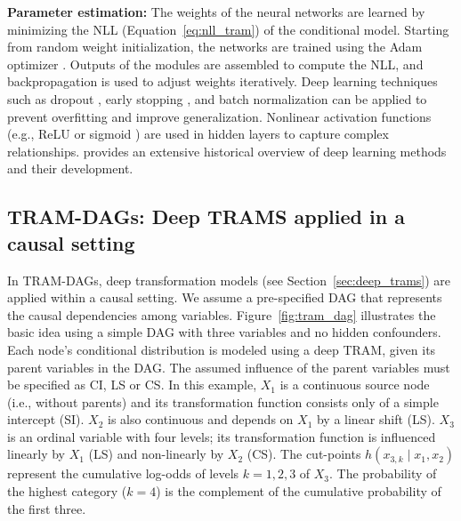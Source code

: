 %
\medskip

\textbf{Parameter estimation:} The weights of the neural networks are learned by minimizing the NLL (Equation~\ref{eq:nll_tram}) of the conditional model. Starting from random weight initialization, the networks are trained using the Adam optimizer \citep{kingma2015}. Outputs of the modules are assembled to compute the NLL, and backpropagation \citep{rumelhart1986} is used to adjust weights iteratively. Deep learning techniques such as dropout \citep{srivastava2014}, early stopping \citep{prechelt2012}, and batch normalization \citep{Ioffe2015} can be applied to prevent overfitting and improve generalization. Nonlinear activation functions (e.g., ReLU \citealp{glorot2011} or sigmoid \citealp{rumelhart1986}) are used in hidden layers to capture complex relationships. \citet{schmidhuber2015} provides an extensive historical overview of deep learning methods and their development.




\subsection{TRAM-DAGs: Deep TRAMS applied in a causal setting} \label{sec:tram_dags}



In TRAM-DAGs, deep transformation models (see Section~\ref{sec:deep_trams}) are applied within a causal setting. We assume a pre-specified DAG that represents the causal dependencies among variables. 
Figure~\ref{fig:tram_dag} illustrates the basic idea using a simple DAG with three variables and no hidden confounders. Each node's conditional distribution is modeled using a deep TRAM, given its parent variables in the DAG. The assumed influence of the parent variables must be specified as CI, LS or CS. In this example, $X_1$ is a continuous source node (i.e., without parents) and its transformation function consists only of a simple intercept (SI). $X_2$ is also continuous and depends on $X_1$ by a linear shift (LS). $X_3$ is an ordinal variable with four levels; its transformation function is influenced linearly by $X_1$ (LS) and non-linearly by $X_2$ (CS). The cut-points $h(x_{3,k} \mid x_1, x_2)$ represent the cumulative log-odds of levels $k = 1, 2, 3$ of $X_3$. The probability of the highest category ($k = 4$) is the complement of the cumulative probability of the first three.


